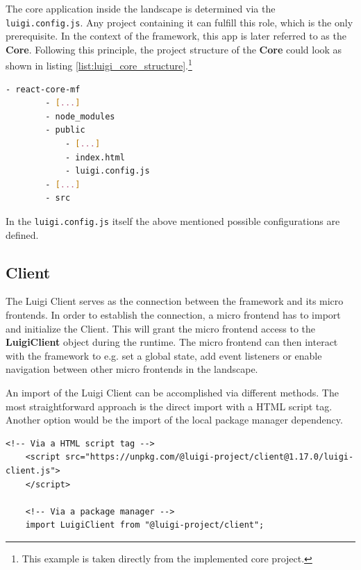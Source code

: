 The core application inside the landscape is determined via the \texttt{luigi.config.js}. Any project containing it can fulfill this role, which is the only prerequisite. In the context of the framework, this app is later referred to as the \textbf{Core}.
Following this principle, the project structure of the \textbf{Core} could look as shown in listing \ref{list:luigi_core_structure}.\footnote{This example is taken directly from the implemented core project.}  

\begin{lstlisting}[language=Bash, caption=Project structure for a Luigi Core application including the \texttt{luigi.config.js}, label=list:luigi_core_structure,  xleftmargin=.0\textwidth, xrightmargin=.0\textwidth]
	- react-core-mf
		- [...]
		- node_modules
		- public
			- [...]
			- index.html
			- luigi.config.js
		- [...]
		- src
\end{lstlisting}

In the \texttt{luigi.config.js} itself the above mentioned possible configurations are defined.\cite{luigi_doc_core}

\subsection{Client}

The Luigi Client serves as the connection between the framework and its micro frontends. In order to establish the connection, a micro frontend has to import and initialize the Client. This will grant the micro frontend access to the \textbf{LuigiClient} object during the runtime. The micro frontend can then interact with the framework to e.g. set a global state, add event listeners or enable navigation between other micro frontends in the landscape.

An import of the Luigi Client can be accomplished via different methods. The most straightforward approach is the direct import with a HTML script tag. Another option would be the import of the local package manager dependency.\cite{luigi_client}

\begin{lstlisting}[caption=Import methods of the Luigi Client, label=list:import_luigi_client,  xleftmargin=.0\textwidth, xrightmargin=.0\textwidth]
	<!-- Via a HTML script tag -->
	<script src="https://unpkg.com/@luigi-project/client@1.17.0/luigi-client.js">
	</script>
	
	<!-- Via a package manager -->
	import LuigiClient from "@luigi-project/client";
\end{lstlisting}

